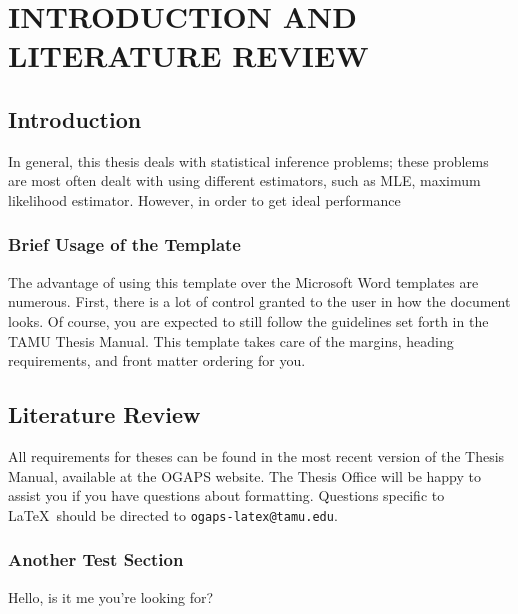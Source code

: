 %
%
%



\pagestyle{plain} %
\setcounter{page}{1}


\chapter{\uppercase {Introduction and Literature Review}}

\section{Introduction}

In general, this thesis deals with statistical inference problems; these problems are most often dealt with using different estimators, such as MLE, maximum likelihood estimator.
However, in order to get ideal performance 


\subsection{Brief Usage of the Template}

The advantage of using this template over the Microsoft Word templates are numerous. First, there is a lot of control granted to the user in how the document looks. Of course, you are expected to still follow the guidelines set forth in the TAMU Thesis Manual. This template takes care of the margins, heading requirements, and front matter ordering for you.


\section{Literature Review}

All requirements for theses can be found in the most recent version of the Thesis Manual, available at the OGAPS website. The Thesis Office will be happy to assist you if you have questions about formatting. Questions specific to \LaTeX\ should be directed to \texttt{ogaps-latex@tamu.edu}.

\subsection{Another Test Section}
 
Hello, is it me you're looking for?


 

